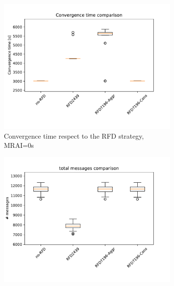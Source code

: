 \begin{figure}[H]
     \centering
     \begin{subfigure}[b]{0.325\textwidth}
         \centering
         \includegraphics[width=\textwidth]{images/RFD/miceVSelephants/MultiMRAI/0/mice/cisco_1000MRAI0_rfd_comparison_time_boxplot.pdf}
         \caption{Convergence time respect to the RFD strategy, MRAI=0s}
         \label{fig:1000_RFD_MRAI30_time_mice}
     \end{subfigure}
     \hfill
     \begin{subfigure}[b]{0.325\textwidth}
         \centering
         \includegraphics[width=\textwidth]{images/RFD/miceVSelephants/MultiMRAI/0/mice/cisco_1000MRAI0_rfd_comparison_messages_boxplot.pdf}

\end{subfigure}
\end{figure}
